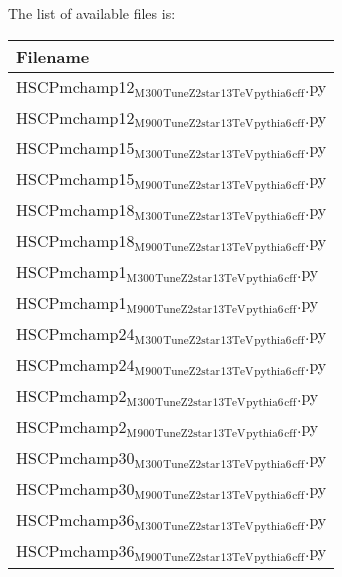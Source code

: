 \documentclass[11 pt , letterpaper , twoside , openright]{book}
\begin{document}
\begin{enumerate}
\begin{enumerate}
The list of available files is:
\begin{center}
\begin{tabular}{l}
Filename\\
\hline
HSCPmchamp12$_{\text{M}}$$_{\text{300}}$$_{\text{TuneZ2star}}$$_{\text{13TeV}}$$_{\text{pythia6}}$$_{\text{cff}}$.py\\
HSCPmchamp12$_{\text{M}}$$_{\text{900}}$$_{\text{TuneZ2star}}$$_{\text{13TeV}}$$_{\text{pythia6}}$$_{\text{cff}}$.py\\
HSCPmchamp15$_{\text{M}}$$_{\text{300}}$$_{\text{TuneZ2star}}$$_{\text{13TeV}}$$_{\text{pythia6}}$$_{\text{cff}}$.py\\
HSCPmchamp15$_{\text{M}}$$_{\text{900}}$$_{\text{TuneZ2star}}$$_{\text{13TeV}}$$_{\text{pythia6}}$$_{\text{cff}}$.py\\
HSCPmchamp18$_{\text{M}}$$_{\text{300}}$$_{\text{TuneZ2star}}$$_{\text{13TeV}}$$_{\text{pythia6}}$$_{\text{cff}}$.py\\
HSCPmchamp18$_{\text{M}}$$_{\text{900}}$$_{\text{TuneZ2star}}$$_{\text{13TeV}}$$_{\text{pythia6}}$$_{\text{cff}}$.py\\
HSCPmchamp1$_{\text{M}}$$_{\text{300}}$$_{\text{TuneZ2star}}$$_{\text{13TeV}}$$_{\text{pythia6}}$$_{\text{cff}}$.py\\
HSCPmchamp1$_{\text{M}}$$_{\text{900}}$$_{\text{TuneZ2star}}$$_{\text{13TeV}}$$_{\text{pythia6}}$$_{\text{cff}}$.py\\
HSCPmchamp24$_{\text{M}}$$_{\text{300}}$$_{\text{TuneZ2star}}$$_{\text{13TeV}}$$_{\text{pythia6}}$$_{\text{cff}}$.py\\
HSCPmchamp24$_{\text{M}}$$_{\text{900}}$$_{\text{TuneZ2star}}$$_{\text{13TeV}}$$_{\text{pythia6}}$$_{\text{cff}}$.py\\
HSCPmchamp2$_{\text{M}}$$_{\text{300}}$$_{\text{TuneZ2star}}$$_{\text{13TeV}}$$_{\text{pythia6}}$$_{\text{cff}}$.py\\
HSCPmchamp2$_{\text{M}}$$_{\text{900}}$$_{\text{TuneZ2star}}$$_{\text{13TeV}}$$_{\text{pythia6}}$$_{\text{cff}}$.py\\
HSCPmchamp30$_{\text{M}}$$_{\text{300}}$$_{\text{TuneZ2star}}$$_{\text{13TeV}}$$_{\text{pythia6}}$$_{\text{cff}}$.py\\
HSCPmchamp30$_{\text{M}}$$_{\text{900}}$$_{\text{TuneZ2star}}$$_{\text{13TeV}}$$_{\text{pythia6}}$$_{\text{cff}}$.py\\
HSCPmchamp36$_{\text{M}}$$_{\text{300}}$$_{\text{TuneZ2star}}$$_{\text{13TeV}}$$_{\text{pythia6}}$$_{\text{cff}}$.py\\
HSCPmchamp36$_{\text{M}}$$_{\text{900}}$$_{\text{TuneZ2star}}$$_{\text{13TeV}}$$_{\text{pythia6}}$$_{\text{cff}}$.py\\

\end{tabular}
\end{center}
\end{enumerate}
\end{enumerate}
\end{document}

